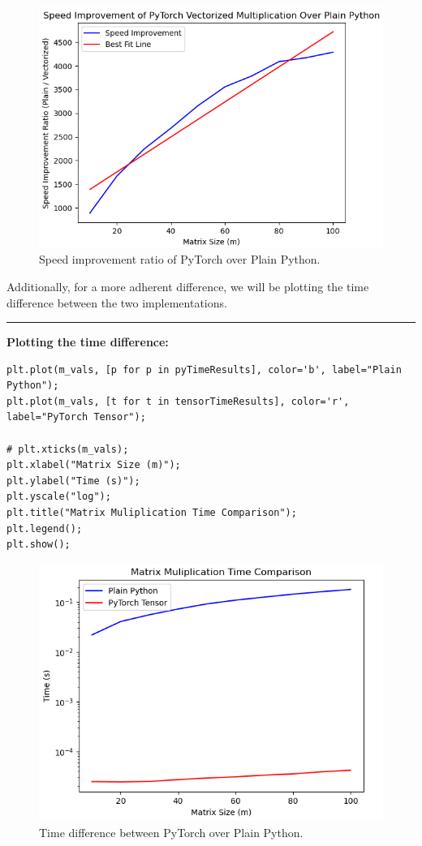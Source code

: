 \documentclass[12pt]{article}
\begin{document}
\begin{figure}[ht]
    \centering
    \includegraphics[width=1\linewidth]{PythonVSPyTorch.PNG}
    \caption{Speed improvement ratio of PyTorch over Plain Python.}
\end{figure}

\noindent Additionally, for a more adherent difference, we will be plotting the time difference between the two implementations.

\noindent\rule{\textwidth}{0.4pt}
\noindent\textbf{Plotting the time difference:}
\begin{lstlisting}
plt.plot(m_vals, [p for p in pyTimeResults], color='b', label="Plain Python");
plt.plot(m_vals, [t for t in tensorTimeResults], color='r', label="PyTorch Tensor");

# plt.xticks(m_vals);
plt.xlabel("Matrix Size (m)");
plt.ylabel("Time (s)");
plt.yscale("log");
plt.title("Matrix Muliplication Time Comparison");
plt.legend();
plt.show();
\end{lstlisting}

\newpage

\begin{figure}[ht]
    \centering
    \includegraphics[width=1\linewidth]{TimeDiffPythonVsPyTorch.PNG}
    \caption{Time difference between PyTorch over Plain Python.}
\end{figure}
\end{document}
